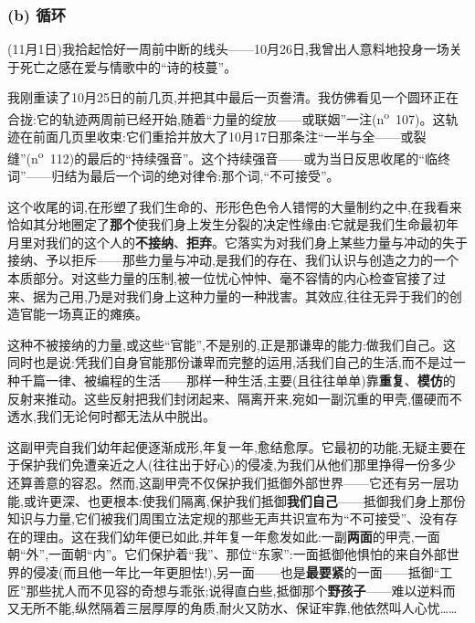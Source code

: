 \subsubsection*{(b) 循环}
\label{ch18:local:h23}

\label{ch18:local:n20}

(11月1日)我拾起恰好一周前中断的线头——10月26日,我曾出人意料地投身一场关于死亡之感在爱与情歌中的“诗的枝蔓”。

我刚重读了10月25日的前几页,并把其中最后一页誊清。我仿佛看见一个圆环正在合拢:它的轨迹两周前已经开始,随着“力量的绽放——或联姻”一注(n\textsuperscript{o}~107)。这轨迹在前面几页里收束:它们重拾并放大了10月17日那条注“一半与全——或裂缝”(n\textsuperscript{o}~112)的最后的“持续强音”。这个持续强音——或为当日反思收尾的“临终词”——归结为最后一个词的绝对律令:那个词,“不可接受”。

这个收尾的词,在形塑了我们生命的、形形色色令人错愕的大量制约之中,在我看来恰如其分地圈定了\textbf{那个}使我们身上发生分裂的决定性缘由:它就是我们生命最初年月里对我们的这个人的\textbf{不接纳}、\textbf{拒弃}。它落实为对我们身上某些力量与冲动的失于接纳、予以拒斥——那些力量与冲动,是我们的存在、我们认识与创造之力的一个本质部分。对这些力量的压制,被一位忧心忡忡、毫不容情的内心检查官接了过来、据为己用,乃是对我们身上这种力量的一种戕害。其效应,往往无异于我们的创造官能一场真正的瘫痪。

\dmark{}这种不被接纳的力量,或这些“官能”,不是别的,正是那谦卑的能力:做我们自己。这同时也是说:凭我们自身官能那份谦卑而完整的运用,活我们自己的生活,而不是过一种千篇一律、被编程的生活——那样一种生活,主要(且往往单单)靠\textbf{重复}、\textbf{模仿}的反射来推动。这些反射把我们封闭起来、隔离开来,宛如一副沉重的甲壳,僵硬而不透水,我们无论何时都无法从中脱出。

这副甲壳自我们幼年起便逐渐成形,年复一年,愈结愈厚。它最初的功能,无疑主要在于保护我们免遭亲近之人(往往出于好心)的侵凌,为我们从他们那里挣得一份多少还算善意的容忍。然而,这副甲壳不仅保护我们抵御外部世界——它还有另一层功能,或许更深、也更根本:使我们隔离,保护我们抵御\textbf{我们自己}——抵御我们身上那份知识与力量,它们被我们周围立法定规的那些无声共识宣布为“不可接受”、没有存在的理由。这在我们幼年便已如此,并年复一年愈发如此:一副\textbf{两面}的甲壳,一面朝“外”,一面朝“内”。它们保护着“我”、那位“东家”:一面抵御他惧怕的来自外部世界的侵凌(而且他一年比一年更胆怯!),另一面——也是\textbf{最要紧}的一面——抵御“工匠”那些扰人而不见容的奇想与乖张;说得直白些,抵御那个\textbf{野孩子}——难以逆料而又无所不能,纵然隔着三层厚厚的角质,耐火又防水、保证牢靠,他依然叫人心忧……


